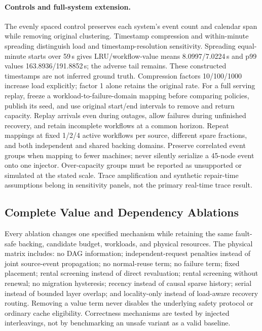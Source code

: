 \documentclass[sigplan,10pt,anonymous,nonacm]{acmart}
\begin{document}
\paragraph{Controls and full-system extension.}
The evenly spaced control preserves each system's event count and
calendar span while removing original clustering. Timestamp compression
and within-minute spreading distinguish load and timestamp-resolution
sensitivity. Spreading equal-minute starts over 59\,s gives LRU/workflow-value
means 8.0997/7.0224\,s and p99 values 163.8936/191.8852\,s; the adverse
tail remains. These constructed timestamps are not inferred ground truth.
Compression
factors 10/100/1000 increase load explicitly; factor 1 alone retains the
original rate. For a full serving replay, freeze a workload-to-failure-domain
mapping before comparing policies, publish its seed, and use original
start/end intervals to remove and return capacity. Replay arrivals even
during outages, allow failures during unfinished recovery, and retain
incomplete workflows at a common horizon. Repeat mappings at fixed
1/2/4 active workflows per source, different spare fractions, and both
independent and shared backing domains. Preserve correlated event groups
when mapping to fewer machines; never silently serialize a 45-node event
onto one injector. Over-capacity groups must be reported as unsupported
or simulated at the stated scale. Trace amplification and synthetic
repair-time assumptions belong in sensitivity panels, not the primary
real-time trace result.

\FloatBarrier
\subsection{Complete Value and Dependency Ablations}

Every ablation changes one specified mechanism while retaining the same
fault-safe backing, candidate budget, workloads, and physical resources.
The physical matrix includes: no DAG information; independent-request
penalties instead of joint source-event propagation; no normal-reuse
term; no failure term; fixed placement; rental screening instead of direct
revaluation; rental screening without renewal; no migration hysteresis;
recency instead of causal
sparse history; serial instead of bounded layer overlap; and locality-only
instead of load-aware recovery routing. Removing a value term never
disables the underlying safety protocol or ordinary cache eligibility.
Correctness mechanisms are tested by injected interleavings, not by
benchmarking an unsafe variant as a valid baseline.
\end{document}
